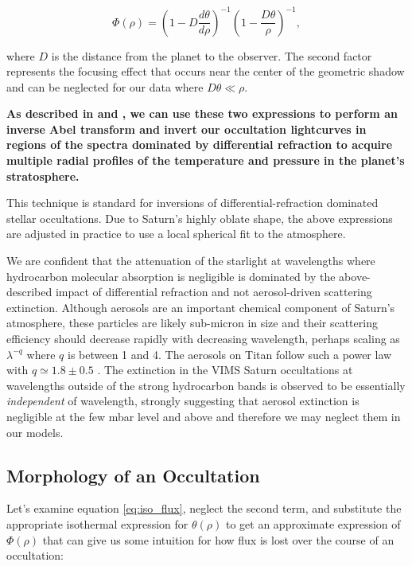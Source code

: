 \documentclass[preprint]{aastex}
\newcommand{\beq}{\begin{equation}}
\newcommand{\eeq}{\end{equation}}
\begin{document}
\begin{multicols}{2}
\beq 
 \Phi(\rho) = \left( 1 - D\frac{d\theta}{d\rho} \right)^{-1}\left( 1 - \frac{D\theta}{\rho} \right)^{-1},
\label{eq:iso_flux}
\eeq

\noindent where $D$ is the distance from the planet to the observer. The second
factor represents the focusing effect that occurs near the center of the
geometric shadow and can be neglected for our data where $D\theta\ll\rho$.

{\bf As described in \cite{Elliot77} and \cite{French78}, we can use these two
expressions to perform an inverse Abel transform and invert our occultation
lightcurves in regions of the spectra dominated by differential refraction to
acquire multiple radial profiles of the temperature and pressure in the
planet's stratosphere.} 

This technique is standard for inversions of differential-refraction dominated
stellar occultations.  Due to Saturn's highly oblate shape, the above
expressions are adjusted in practice to use a local spherical fit to the
atmosphere.

We are confident that the attenuation of the starlight at wavelengths where
hydrocarbon molecular absorption is negligible is dominated by the
above-described impact of differential refraction and not aerosol-driven
scattering extinction. Although aerosols are an important chemical component of
Saturn's atmosphere, these particles are likely sub-micron in size and their
scattering efficiency should decrease rapidly with decreasing wavelength,
perhaps scaling as $\lambda^{-q}$ where $q$ is between 1 and 4. The aerosols on
Titan follow such a power law with $q\simeq1.8\pm0.5$ \citep{Bellucci09}. The
extinction in the VIMS Saturn occultations at wavelengths outside of the strong
hydrocarbon bands is observed to be essentially {\sl independent} of
wavelength, strongly suggesting that aerosol extinction is negligible at the
few mbar level and above and therefore we may neglect them in our models.

\vspace{-9mm}
\subsection{Morphology of an Occultation}
\vspace{-3mm}

Let's examine equation \ref{eq:iso_flux}, neglect the second term, and
substitute the appropriate isothermal expression for $\theta(\rho)$ to get an
approximate expression of $\Phi(\rho)$ that can give us some intuition for how
flux is lost over the course of an occultation:


\end{multicols}
\end{document}
